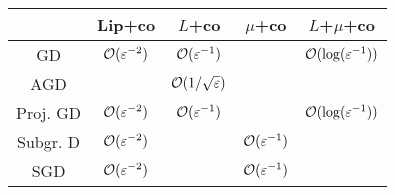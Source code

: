 \documentclass{standalone}
\begin{document}
\begin{tabular}{c|c|c|c|c}
& Lip+co & $L$+co & $\mu$+co & $L$+$\mu$+co \\
\hline
GD & $\mathcal{O}(\varepsilon^{-2})$ & $\mathcal{O}(\varepsilon^{-1})$ & & $\mathcal{O}(\log(\varepsilon^{-1}))$ \\
AGD & & $\mathcal{O}(1/\sqrt{\varepsilon})$ & & \\
Proj. GD & $\mathcal{O}(\varepsilon^{-2})$ & $\mathcal{O}(\varepsilon^{-1})$ & & $\mathcal{O}(\log(\varepsilon^{-1}))$ \\
Subgr. D & $\mathcal{O}(\varepsilon^{-2})$ & & $\mathcal{O}(\varepsilon^{-1})$ & \\
SGD & $\mathcal{O}(\varepsilon^{-2})$ & & $\mathcal{O}(\varepsilon^{-1})$ & \\
\end{tabular}
\end{document}
